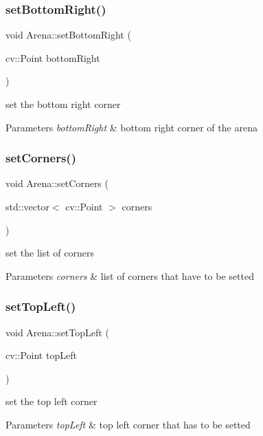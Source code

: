\subsubsection{\texorpdfstring{set\+Bottom\+Right()}{setBottomRight()}}
{\footnotesize\ttfamily void Arena\+::set\+Bottom\+Right (\begin{DoxyParamCaption}\item[{cv\+::\+Point}]{bottom\+Right }\end{DoxyParamCaption})}

set the bottom right corner 
\begin{DoxyParams}{Parameters}
{\em bottom\+Right} & bottom right corner of the arena \\
\hline
\end{DoxyParams}
\mbox{\label{class_arena_a7f822f33ff5810d4d266183e7606c0fe}} 
\subsubsection{\texorpdfstring{set\+Corners()}{setCorners()}}
{\footnotesize\ttfamily void Arena\+::set\+Corners (\begin{DoxyParamCaption}\item[{std\+::vector$<$ cv\+::\+Point $>$}]{corners }\end{DoxyParamCaption})}

set the list of corners 
\begin{DoxyParams}{Parameters}
{\em corners} & list of corners that have to be setted \\
\hline
\end{DoxyParams}
\mbox{\label{class_arena_a7ab570cb7821df75c6da9af6491be034}} 
\subsubsection{\texorpdfstring{set\+Top\+Left()}{setTopLeft()}}
{\footnotesize\ttfamily void Arena\+::set\+Top\+Left (\begin{DoxyParamCaption}\item[{cv\+::\+Point}]{top\+Left }\end{DoxyParamCaption})}

set the top left corner 
\begin{DoxyParams}{Parameters}
{\em top\+Left} & top left corner that has to be setted \\
\hline
\end{DoxyParams}
\mbox{\label{class_arena_a82c7fa04e8acf52f6edecc1ee1c38001}} 
